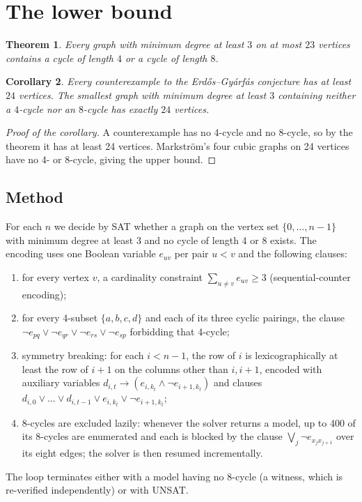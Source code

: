 \documentclass[11pt]{article}
\newtheorem{theorem}{Theorem}[section]
\newtheorem{corollary}[theorem]{Corollary}
\theoremstyle{remark}
\theoremstyle{definition}
\begin{document}
\section{The lower bound}

\begin{theorem}\label{thm:A}
Every graph with minimum degree at least $3$ on at most $23$ vertices contains a cycle of length $4$ or a cycle of length $8$.
\end{theorem}

\begin{corollary}
Every counterexample to the Erd\H{o}s--Gy\'arf\'as conjecture has at least $24$ vertices. The smallest graph with minimum degree at least $3$ containing neither a $4$-cycle nor an $8$-cycle has exactly $24$ vertices.
\end{corollary}

\begin{proof}[Proof of the corollary]
A counterexample has no 4-cycle and no 8-cycle, so by the theorem it has at least 24 vertices. Markstr\"om's four cubic graphs on 24 vertices \cite{Markstrom} have no 4- or 8-cycle, giving the upper bound.
\end{proof}

\subsection{Method}

For each $n$ we decide by SAT whether a graph on the vertex set $\{0,\dots,n-1\}$ with minimum degree at least 3 and no cycle of length 4 or 8 exists. The encoding uses one Boolean variable $e_{uv}$ per pair $u<v$ and the following clauses:
\begin{enumerate}
\item for every vertex $v$, a cardinality constraint $\sum_{u\ne v} e_{uv}\ge 3$ (sequential-counter encoding);
\item for every 4-subset $\{a,b,c,d\}$ and each of its three cyclic pairings, the clause $\neg e_{pq}\vee\neg e_{qr}\vee\neg e_{rs}\vee\neg e_{sp}$ forbidding that 4-cycle;
\item symmetry breaking: for each $i<n-1$, the row of $i$ is lexicographically at least the row of $i+1$ on the columns other than $i,i+1$, encoded with auxiliary variables $d_{i,t}\to(e_{i,k_t}\wedge\neg e_{i+1,k_t})$ and clauses $d_{i,0}\vee\dots\vee d_{i,t-1}\vee e_{i,k_t}\vee\neg e_{i+1,k_t}$;
\item 8-cycles are excluded lazily: whenever the solver returns a model, up to 400 of its 8-cycles are enumerated and each is blocked by the clause $\bigvee_{j}\neg e_{x_j x_{j+1}}$ over its eight edges; the solver is then resumed incrementally.
\end{enumerate}
The loop terminates either with a model having no 8-cycle (a witness, which is re-verified independently) or with UNSAT.
\end{document}
